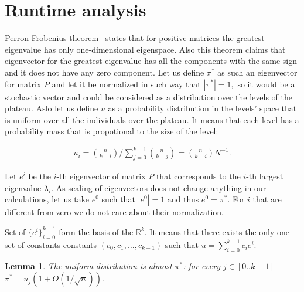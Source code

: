\documentclass{article}
\newtheorem{lemma}{Lemma}
\begin{document}
\section{Runtime analysis}

Perron-Frobenius theorem~\cite{} states that for positive matrices the greatest eigenvalue has only one-dimensional eigenspace. Also this theorem claims that eigenvector for the greatest eigenvalue has all the components with the same sign and it does not have any zero component. Let us define $\pi^*$ as such an eigenvector for matrix $P$ and let it be normalized in such way that $|\pi^*| = 1,$ so it would be a stochastic vector and could be considered as a distribution over the levels of the plateau. Aslo let us define $u$ as a probability distribution in the levels' space that is uniform over all the individuals over the plateau. It means that each level has a probability mass that is propotional to the size of the level:

\begin{align*}
  u_i = \binom{n}{k - i} / \sum\limits_{j = 0}^{k - 1} \binom{n}{k - j} = \binom{n}{k - i}N^{-1}.
\end{align*}

Let $e^i$ be the $i$-th eigenvector of matrix $P$ that corresponds to the $i$-th largest eigenvalue $\lambda_i.$ As scaling of eigenvectors does not change anything in our calculations, let us take $e^0$ such that $|e^0| = 1$ and thus $e^0 = \pi^*.$ For $i$ that are different from zero we do not care about their normalization.

Set of $\{e^i\}_{i = 0}^{k - 1}$ form the basis of the $\mathbb{R}^k.$ It means that there exists the only one set of constants constants $(c_0, c_1, \dots, c_{k - 1})$ such that $u = \sum\limits_{i = 0}^{k - 1} c_i e^i.$

\begin{lemma}\label{lemma_uniform}
The uniform distribution is almost $\pi^*$: for every $j \in [0..k-1]$ $\pi^* = u_j (1 + O(1/\sqrt{n})).$
\end{lemma}
\end{document}
